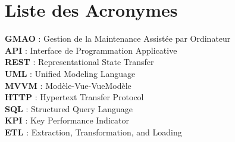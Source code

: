 \chapter*{Liste des Acronymes}

\noindent
\textbf{GMAO} : Gestion de la Maintenance Assistée par Ordinateur\newline\\
\noindent
\textbf{API} : Interface de Programmation Applicative\newline\\
\noindent
\textbf{REST} : Representational State Transfer\newline\\
\noindent
\textbf{UML} : Unified Modeling Language\newline\\
\noindent
\textbf{MVVM} : Modèle-Vue-VueModèle\newline\\
\noindent
\textbf{HTTP} : Hypertext Transfer Protocol\newline\\
\noindent
\textbf{SQL} : Structured Query Language\newline\\
\noindent
\textbf{KPI} : Key Performance Indicator \newline\\
\noindent
\textbf{ETL} : Extraction, Transformation, and Loading \newline

